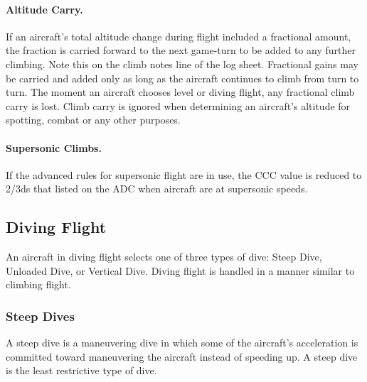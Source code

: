 \paragraph{Altitude Carry.} If an aircraft's total altitude change during flight included a fractional amount, the fraction is carried forward to the next game-turn to be added to any further climbing. Note this on the climb notes line of the log sheet. Fractional gains may be carried and added only as long as the aircraft continues to climb from turn to turn. The moment an aircraft chooses level or diving flight, any fractional climb carry is lost. Climb carry is ignored when determining an aircraft's altitude for spotting, combat or any other purposes.

\paragraph{Supersonic Climbs.} If the advanced rules for supersonic flight are in use, the CCC value is reduced to 2/3ds that listed on the ADC when aircraft are at supersonic speeds.

\subsection{Diving Flight}

An aircraft in diving flight selects one of three types of dive: Steep Dive, Unloaded Dive, or Vertical Dive. Diving flight is handled in a manner similar to climbing flight. 

\subsubsection{Steep Dives}

A steep dive is a maneuvering dive in which some of the aircraft's acceleration is committed toward maneuvering the aircraft instead of speeding up. A steep dive is the least restrictive type of dive.

